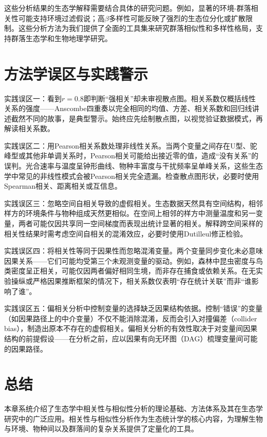 \documentclass[
  twoside,12pt,fontset=none]{ctexbook}
\begin{document}
这些分析结果的生态学解释需要结合具体的研究问题。例如，显著的环境-群落相关性可能支持环境过滤假说；高\(\beta\)多样性可能反映了强烈的生态位分化或扩散限制。这些分析方法为我们提供了全面的工具集来研究群落相似性和多样性格局，支持群落生态学和生物地理学研究。

\hypertarget{ux65b9ux6cd5ux5b66ux8befux533aux4e0eux5b9eux8df5ux8b66ux793a-3}{%
\section{方法学误区与实践警示}\label{ux65b9ux6cd5ux5b66ux8befux533aux4e0eux5b9eux8df5ux8b66ux793a-3}}

实践误区一：看到\(r=0.8\)即判断``强相关''却未审视散点图。相关系数仅概括线性关系的强度------Anscombe四重奏以完全相同的均值、方差、相关系数和回归线讲述截然不同的故事，是典型警示。始终应先绘制散点图，以视觉验证数据模式，再解读相关系数。

实践误区二：用Pearson相关系数处理非线性关系。当两个变量之间存在U型、驼峰型或其他非单调关系时，Pearson相关可能给出接近零的值，造成``没有关系''的误判。光合速率与温度呈钟形曲线、物种丰富度与干扰频率呈单峰关系，这些生态学中常见的非线性模式会被Pearson相关完全遗漏。检查散点图形状，必要时使用Spearman相关、距离相关或互信息。

实践误区三：忽略空间自相关导致的虚假相关。生态数据天然具有空间结构，相邻样方的环境条件与物种组成天然更相似。在空间上相邻的样方中测量温度和另一变量，两者可能仅因共享同一空间梯度而表现出统计显著的相关。解释跨空间采样的相关性结果时需考虑空间自相关的混淆效应，必要时使用Dutilleul修正检验。

实践误区四：将相关性等同于因果性而忽略混淆变量。两个变量同步变化未必意味因果关系------它们可能均受第三个未观测变量的驱动。例如，森林中昆虫密度与鸟类密度呈正相关，可能仅因两者偏好相同生境，而非存在捕食或依赖关系。在无实验操纵或严格因果推断框架的情况下，相关系数仅表明``存在统计关联''而非``谁影响了谁''。

实践误区五：偏相关分析中控制变量的选择缺乏因果结构依据。控制``错误''的变量（如因果路径上的中介变量）不仅不能消除混淆，反而会引入对撞偏差（collider bias），制造出原本不存在的虚假相关。偏相关分析的有效性取决于对变量间因果结构的前提假设------在分析之前，应以因果有向无环图（DAG）梳理变量间可能的因果路径。

\hypertarget{ux603bux7ed3-4}{%
\section{总结}\label{ux603bux7ed3-4}}

本章系统介绍了生态学中相关性与相似性分析的理论基础、方法体系及其在生态学研究中的广泛应用。相关性与相似性分析作为生态统计学的核心内容，为理解生物与环境、物种间以及群落间的复杂关系提供了定量化的工具。
\end{document}
